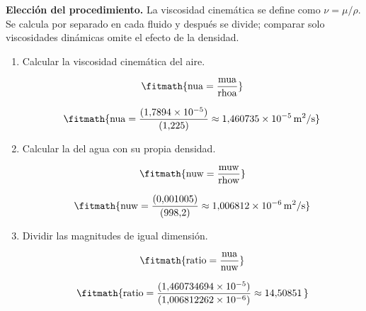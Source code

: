 \noindent\textbf{Elección del procedimiento.} La viscosidad cinemática se define como $\nu=\mu/\rho$. Se calcula por separado en cada fluido y después se divide; comparar solo viscosidades dinámicas omite el efecto de la densidad.

\begin{enumerate}

\item Calcular la viscosidad cinemática del aire.

\[\fitmath{\mathrm{nua}=\frac{\mathrm{mua}}{\mathrm{rhoa}}}\]

\[\fitmath{\mathrm{nua}=\frac{(1{,}7894\times10^{-5})}{(1{,}225)}\approx 1{,}460735\times10^{-5}\,\mathrm{m^{2}/s}}\]

\item Calcular la del agua con su propia densidad.

\[\fitmath{\mathrm{nuw}=\frac{\mathrm{muw}}{\mathrm{rhow}}}\]

\[\fitmath{\mathrm{nuw}=\frac{(0{,}001005)}{(998{,}2)}\approx 1{,}006812\times10^{-6}\,\mathrm{m^{2}/s}}\]

\item Dividir las magnitudes de igual dimensión.

\[\fitmath{\mathrm{ratio}=\frac{\mathrm{nua}}{\mathrm{nuw}}}\]

\[\fitmath{\mathrm{ratio}=\frac{(1{,}460734694\times10^{-5})}{(1{,}006812262\times10^{-6})}\approx 14{,}50851\,}\]

\end{enumerate}
